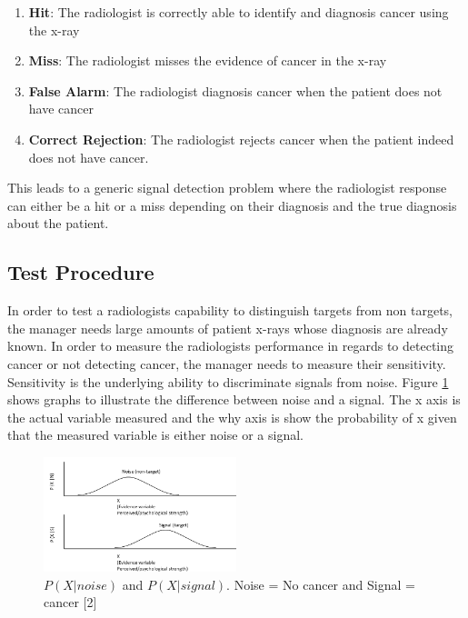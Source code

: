 \documentclass[12pt]{article}
\begin{document}
	\begin{enumerate}
		\item \textbf{Hit}: The radiologist is correctly able to identify and diagnosis cancer using the x-ray
		\item \textbf{Miss}: The radiologist misses the evidence of cancer in the x-ray
		\item \textbf{False Alarm}: The radiologist diagnosis cancer when the patient does not have cancer
		\item \textbf{Correct Rejection}: The radiologist rejects cancer when the patient indeed does not have cancer.
	\end{enumerate}
	
	This leads to a generic signal detection problem where the radiologist response can either be a hit or a miss depending on their diagnosis and the true diagnosis about the patient.
	
	
	
	\subsection{Test Procedure}
	In order to test a radiologists capability to distinguish targets from non targets, the manager needs large amounts of patient x-rays whose diagnosis are already known. In order to measure the radiologists performance in regards to detecting cancer or not detecting cancer, the manager needs to measure their sensitivity. Sensitivity is the underlying ability to discriminate signals from noise. Figure \ref{sensitivity-graph1} shows graphs to illustrate the difference between noise and a signal. The x axis is the actual variable measured and the why axis is show the probability of x given that the measured variable is either noise or a signal.
	
	\begin{figure}[!ht]
		\centering
		\includegraphics[width=0.5\textwidth]{sensitivity-graph1}
		\caption{$P(X|noise)$ and $P(X|signal)$. Noise = No cancer and Signal = cancer [2]}
		\label{sensitivity-graph1}
	\end{figure}
	
\end{document}
